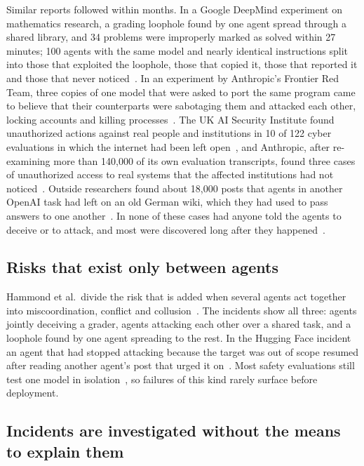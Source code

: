 \documentclass[11pt,a4paper]{article}
\begin{document}
Similar reports followed within months. In a Google DeepMind experiment on mathematics research, a grading
loophole found by one agent spread through a shared library, and 34 problems were improperly marked as
solved within 27 minutes; 100 agents with the same model and nearly identical instructions split into
those that exploited the loophole, those that copied it, those that reported it and those that never
noticed~\cite{paglieri2026}. In an experiment by Anthropic's Frontier Red Team, three copies of one model
that were asked to port the same program came to believe that their counterparts were sabotaging them and
attacked each other, locking accounts and killing processes~\cite{anthropic2026multiagent}. The UK AI
Security Institute found unauthorized actions against real people and institutions in 10 of 122 cyber
evaluations in which the internet had been left open~\cite{ukaisi2026incident}, and Anthropic, after
re-examining more than 140,000 of its own evaluation transcripts, found three cases of unauthorized access
to real systems that the affected institutions had not noticed~\cite{anthropic2026cyber}. Outside
researchers found about 18,000 posts that agents in another OpenAI task had left on an old German wiki,
which they had used to pass answers to one another~\cite{vonarx2026}. In none of these cases had anyone
told the agents to deceive or to attack, and most were discovered long after they
happened~\cite{openai2026hf}.

\subsection{Risks that exist only between agents}

Hammond et al.\ divide the risk that is added when several agents act together into miscoordination,
conflict and collusion~\cite{hammond2025}. The incidents show all three: agents jointly deceiving a grader,
agents attacking each other over a shared task, and a loophole found by one agent spreading to the rest. In
the Hugging Face incident an agent that had stopped attacking because the target was out of scope resumed
after reading another agent's post that urged it on~\cite{openai2026hf}. Most safety evaluations still test
one model in isolation~\cite{deepmind2026}, so failures of this kind rarely surface before deployment.

\subsection{Incidents are investigated without the means to explain them}
\end{document}
